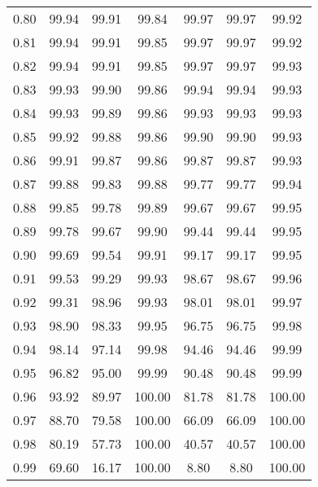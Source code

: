 \begin{tabular}{|c|c|c|c|c|c|c|}
      0.80 &     99.94 &     99.91 &      99.84 &   99.97 &      99.97 &         99.92 \\
      0.81 &     99.94 &     99.91 &      99.85 &   99.97 &      99.97 &         99.92 \\
      0.82 &     99.94 &     99.91 &      99.85 &   99.97 &      99.97 &         99.93 \\
      0.83 &     99.93 &     99.90 &      99.86 &   99.94 &      99.94 &         99.93 \\
      0.84 &     99.93 &     99.89 &      99.86 &   99.93 &      99.93 &         99.93 \\
      0.85 &     99.92 &     99.88 &      99.86 &   99.90 &      99.90 &         99.93 \\
      0.86 &     99.91 &     99.87 &      99.86 &   99.87 &      99.87 &         99.93 \\
      0.87 &     99.88 &     99.83 &      99.88 &   99.77 &      99.77 &         99.94 \\
      0.88 &     99.85 &     99.78 &      99.89 &   99.67 &      99.67 &         99.95 \\
      0.89 &     99.78 &     99.67 &      99.90 &   99.44 &      99.44 &         99.95 \\
      0.90 &     99.69 &     99.54 &      99.91 &   99.17 &      99.17 &         99.95 \\
      0.91 &     99.53 &     99.29 &      99.93 &   98.67 &      98.67 &         99.96 \\
      0.92 &     99.31 &     98.96 &      99.93 &   98.01 &      98.01 &         99.97 \\
      0.93 &     98.90 &     98.33 &      99.95 &   96.75 &      96.75 &         99.98 \\
      0.94 &     98.14 &     97.14 &      99.98 &   94.46 &      94.46 &         99.99 \\
      0.95 &     96.82 &     95.00 &      99.99 &   90.48 &      90.48 &         99.99 \\
      0.96 &     93.92 &     89.97 &     100.00 &   81.78 &      81.78 &        100.00 \\
      0.97 &     88.70 &     79.58 &     100.00 &   66.09 &      66.09 &        100.00 \\
      0.98 &     80.19 &     57.73 &     100.00 &   40.57 &      40.57 &        100.00 \\
      0.99 &     69.60 &     16.17 &     100.00 &    8.80 &       8.80 &        100.00 \\
\bottomrule
\end{tabular}
